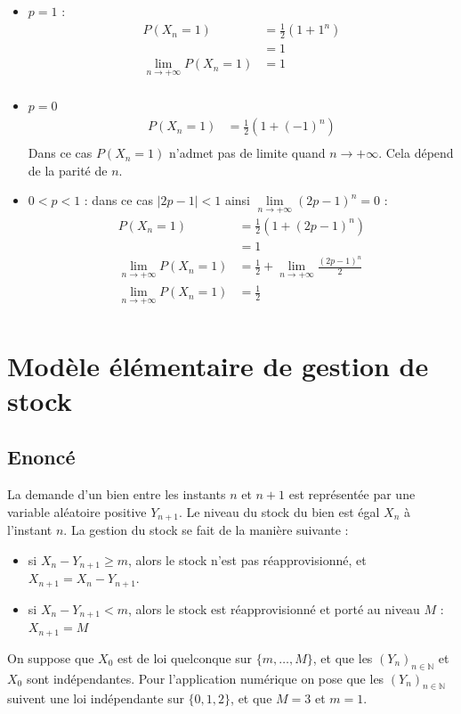 \documentclass[10pt,a4paper,twoside]{article}
\begin{document}
\begin{itemize}
\item $p=1$ :
\begin{align*}
P(X_{n}=1) &= \frac{1}{2}(1+1^{n})\\
&= 1\\
\lim\limits_{n\rightarrow+\infty} P(X_{n}=1) &= 1\\
\end{align*}
\item $p=0$
\begin{align*}
P(X_{n}=1) &= \frac{1}{2}(1+(-1)^{n})\\
\end{align*}
Dans ce cas $P(X_{n}=1)$ n'admet pas de limite quand $n\rightarrow +\infty$. Cela dépend de la parité de $n$.
\item $0<p<1$ : dans ce cas $|2p-1|< 1$ ainsi $\lim\limits_{n\rightarrow+\infty} (2p-1)^{n} = 0$ :
\begin{align*}
P(X_{n}=1) &= \frac{1}{2}(1+(2p-1)^{n})\\
&= 1\\
\lim\limits_{n\rightarrow+\infty} P(X_{n}=1) &= \frac{1}{2} + \lim\limits_{n\rightarrow+\infty} \frac{(2p-1)^{n}}{2}\\
\lim\limits_{n\rightarrow+\infty} P(X_{n}=1) &= \frac{1}{2}\\
\end{align*}
\end{itemize}

\section{Modèle élémentaire de gestion de stock}
\subsection*{Enoncé}
La demande d'un bien entre les instants $n$ et $n+1$ est représentée par une variable aléatoire positive $Y_{n+1}$. Le niveau du stock du bien est égal $X_{n}$ à l'instant $n$. La gestion du stock se fait de la manière suivante :
\begin{itemize}
\item si $X_{n}-Y_{n+1}\geqslant m$, alors le stock n'est pas réapprovisionné, et $X_{n+1} = X_{n}-Y_{n+1}$.
\item si $X_{n}-Y_{n+1}<m$, alors le stock est réapprovisionné et porté au niveau $M$ : $X_{n+1}=M$
\end{itemize}
On suppose que $X_{0}$ est de loi quelconque sur $\{m,\ldots,M\}$, et que les $(Y_{n})_{n\in\mathbb{N}}$ et $X_{0}$ sont indépendantes. Pour l'application numérique on pose que les $(Y_{n})_{n\in\mathbb{N}}$ suivent une loi indépendante sur $\{0,1,2\}$, et que $M=3$ et $m=1$.
\end{document}
